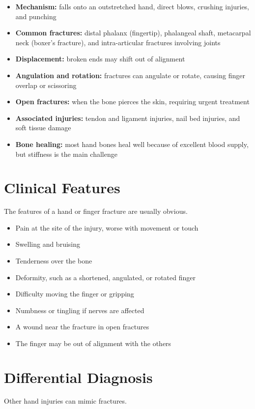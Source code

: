 \begin{itemize}
    \item \textbf{Mechanism:} falls onto an outstretched hand, direct blows, crushing injuries, and punching
    \item \textbf{Common fractures:} distal phalanx (fingertip), phalangeal shaft, metacarpal neck (boxer's fracture), and intra-articular fractures involving joints
    \item \textbf{Displacement:} broken ends may shift out of alignment
    \item \textbf{Angulation and rotation:} fractures can angulate or rotate, causing finger overlap or scissoring
    \item \textbf{Open fractures:} when the bone pierces the skin, requiring urgent treatment
    \item \textbf{Associated injuries:} tendon and ligament injuries, nail bed injuries, and soft tissue damage
    \item \textbf{Bone healing:} most hand bones heal well because of excellent blood supply, but stiffness is the main challenge
\end{itemize}

\section*{Clinical Features}
The features of a hand or finger fracture are usually obvious.

\begin{itemize}
    \item Pain at the site of the injury, worse with movement or touch
    \item Swelling and bruising
    \item Tenderness over the bone
    \item Deformity, such as a shortened, angulated, or rotated finger
    \item Difficulty moving the finger or gripping
    \item Numbness or tingling if nerves are affected
    \item A wound near the fracture in open fractures
    \item The finger may be out of alignment with the others
\end{itemize}

\section*{Differential Diagnosis}
Other hand injuries can mimic fractures.

